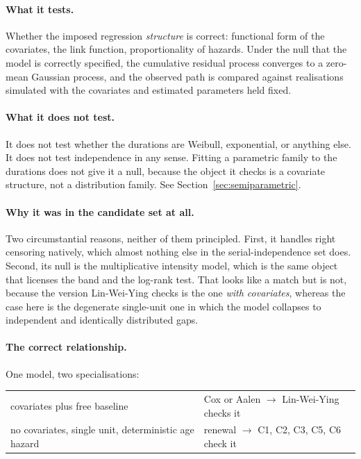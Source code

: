 \documentclass[11pt,a4paper]{article}
\begin{document}
\paragraph{What it tests.} Whether the imposed regression \emph{structure} is correct:
functional form of the covariates, the link function, proportionality of hazards. Under
the null that the model is correctly specified, the cumulative residual process converges
to a zero-mean Gaussian process, and the observed path is compared against realisations
simulated with the covariates and estimated parameters held fixed.

\paragraph{What it does not test.} It does not test whether the durations are Weibull,
exponential, or anything else. It does not test independence in any sense. Fitting a
parametric family to the durations does not give it a null, because the object it checks
is a covariate structure, not a distribution family. See
Section~\ref{sec:semiparametric}.

\paragraph{Why it was in the candidate set at all.} Two circumstantial reasons, neither
of them principled. First, it handles right censoring natively, which almost nothing
else in the serial-independence set does. Second, its null is the multiplicative
intensity model, which is the same object that licenses the band and the log-rank test.
That looks like a match but is not, because the version Lin-Wei-Ying checks is the one
\emph{with covariates}, whereas the case here is the degenerate single-unit one in which
the model collapses to independent and identically distributed gaps.

\paragraph{The correct relationship.} One model, two specialisations:
%
\begin{center}
\begin{tabular}{@{}ll@{}}
\toprule
covariates plus free baseline & Cox or Aalen $\rightarrow$ Lin-Wei-Ying checks it\\
no covariates, single unit, deterministic age hazard & renewal $\rightarrow$ C1, C2, C3, C5, C6 check it\\
\bottomrule
\end{tabular}
\end{center}
\end{document}

